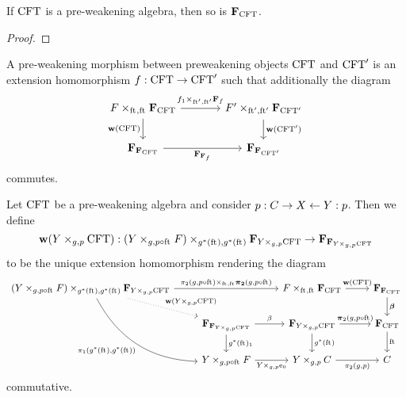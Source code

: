 \begin{lem}
If $\mathrm{CFT}$ is a pre-weakening algebra, then so is $\mathbf{F}_{\mathrm{CFT}}$. 
\end{lem}

\begin{proof}
\end{proof}

\begin{defn}
A pre-weakening morphism between preweakening objects $\mathrm{CFT}$ and $\mathrm{CFT}'$ is an
extension homomorphism $f:\mathrm{CFT}\to \mathrm{CFT}'$ such that additionally the diagram
\begin{equation*}
\begin{tikzcd}[column sep=large]
\cobesys{\stesysf}{\famesys{\stesys}}{\eft}{\eft}
  \ar{d}[swap]{\mathbf{w}(\stesys)}
  \ar{r}{\pullback{f_1}{\famehom{f}}{\eft'}{\eft'}}
  &
\cobesys{\stesysf'}{\famesys{\stesys'}}{\eft'}{\eft'}
  \ar{d}{\mathbf{w}(\stesys')}
  \\
\famesys{\famesys{\stesys}}
  \ar{r}[swap]{\famehom{\famehom{f}}}
  &
\famesys{\famesys{\stesys'}}
\end{tikzcd}
\end{equation*}
commutes.
\end{defn}

\begin{defn}
Let $\mathrm{CFT}$ be a pre-weakening algebra and consider $p:C\rightarrow X\leftarrow Y:p$.
Then we define
\begin{equation*}
\mathbf{w}(\cobesys{Y}{\stesys}{g}{p})
  :
\cobesys
  { (\pullback{Y}{\stesysf}{g}{p\circ\eft})}
  { \famesys{\cobesys{Y}{\stesys}{g}{p}}}
  { g^\ast(\eft)}
  { g^\ast(\eft)}
  \to
\famesys{\famesys{\cobesys{Y}{\stesys}{g}{p}}}
\end{equation*}
to be the unique extension homomorphism rendering the diagram
\begin{equation*}
\begin{tikzcd}
\cobesys
  { \pullback{Y}{\stesysf}{g}{p\circ\eft}}
  { \famesys{\cobesys{Y}{\stesys}{g}{p}}}
  { g^\ast(\eft)}
  { g^\ast(\eft)}
  \ar[bend right]{ddr}[swap]{\pullbackpr{1}{g^\ast(\eft)}{g^\ast(\eft)}}
  \ar{rr}{%
    \pullback
      { \pullbackpr{2}{g}{p\circ\eft}}
      { \boldsymbol{\pi}_\mathbf{2}(g,p\circ\eft)}
      { \eft}
      { \eft}
    }
  \ar[dotted]{dr}{\mathbf{w}(\cobesys{Y}{\stesys}{g}{p})}
  &
  {}&
\cobesys{\stesysf}{\famesys{\stesys}}{\eft}{\eft}
  \ar{r}{\mathbf{w}(\stesys)}
  &
\famesys{\famesys{\stesys}}
  \ar{d}{\boldsymbol{\beta}}
  \\
  {}&
\famesys{\famesys{\cobesys{Y}{\stesys}{g}{p}}}
  \ar{r}{\beta}
  \ar{d}{g^\ast(\eft)_1}
  &
\famesys{\cobesys{Y}{\stesys}{g}{p}}
  \ar{r}{\boldsymbol{\pi}_2(g,p\circ\eft)}
  \ar{d}{g^\ast(\eft)}
  &
\famesys{\stesys}
  \ar{d}{\eft}
  \\
  {}&
\pullback{Y}{\stesysf}{g}{p\circ\eft}
  \ar{r}[swap]{\cobesys{Y}{\ectxext}{g}{p}}
  &
\pullback{Y}{\stesysc}{g}{p}
  \ar{r}[swap]{\pullbackpr{2}{g}{p}}
  &
\stesysc
\end{tikzcd}
\end{equation*}
commutative.
\end{defn}

